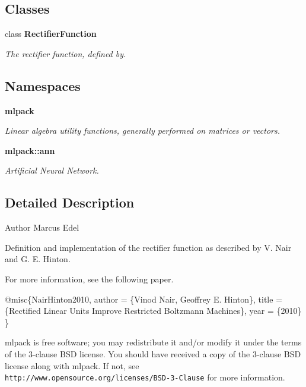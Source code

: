 \subsection*{Classes}
\begin{DoxyCompactItemize}
\item 
class \textbf{ Rectifier\+Function}
\begin{DoxyCompactList}\small\item\em The rectifier function, defined by. \end{DoxyCompactList}\end{DoxyCompactItemize}
\subsection*{Namespaces}
\begin{DoxyCompactItemize}
\item 
 \textbf{ mlpack}
\begin{DoxyCompactList}\small\item\em Linear algebra utility functions, generally performed on matrices or vectors. \end{DoxyCompactList}\item 
 \textbf{ mlpack\+::ann}
\begin{DoxyCompactList}\small\item\em Artificial Neural Network. \end{DoxyCompactList}\end{DoxyCompactItemize}


\subsection{Detailed Description}
\begin{DoxyAuthor}{Author}
Marcus Edel
\end{DoxyAuthor}
Definition and implementation of the rectifier function as described by V. Nair and G. E. Hinton.

For more information, see the following paper.


\begin{DoxyCode}
@misc\{NairHinton2010,
  author = \{Vinod Nair, Geoffrey E. Hinton\},
  title = \{Rectified Linear Units Improve Restricted Boltzmann Machines\},
  year = \{2010\}
\}
\end{DoxyCode}


mlpack is free software; you may redistribute it and/or modify it under the terms of the 3-\/clause B\+SD license. You should have received a copy of the 3-\/clause B\+SD license along with mlpack. If not, see {\tt http\+://www.\+opensource.\+org/licenses/\+B\+S\+D-\/3-\/\+Clause} for more information. 